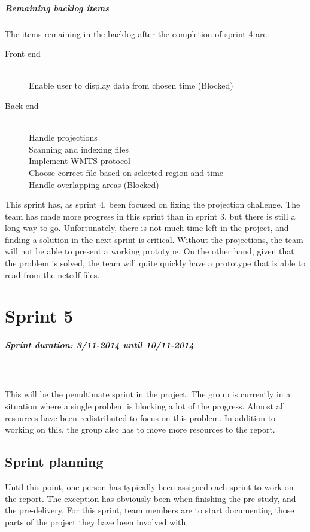 \documentclass[11pt,a4paper,titlepage,oneside]{report}
\begin{document}
\paragraph{Remaining backlog items}
The items remaining in the backlog after the completion of sprint 4 are:

\begin{description}
	\item[Front end] \hfill \\
	Enable user to display data from chosen time (Blocked)
	\item[Back end] \hfill \\
	Handle projections \hfill \\
	Scanning and indexing files \hfill \\
	Implement WMTS protocol \hfill \\
	Choose correct file based on selected region and time \hfill \\
	Handle overlapping areas (Blocked)
\end{description}
This sprint has, as sprint 4, been focused on fixing the projection challenge. The team has made more progress in this sprint than in sprint 3, but there is still a long way to go. Unfortunately, there is not much time left in the project, and finding a solution in the next sprint is critical. Without the projections, the team will not be able to present a working prototype. On the other hand, given that the problem is solved, the team will quite quickly have a prototype that is able to read from the \gls{netcdf} files. 

\chapter{Sprint 5}
\paragraph{Sprint duration: 3/11-2014 until 10/11-2014} \hfill \\
\\
\noindent
This will be the penultimate sprint in the project. The group is currently in a situation where a single problem is blocking a lot of the progress. Almost all resources have been redistributed to focus on this problem. In addition to working on this, the group also has to move more resources to the report. 

\section{Sprint planning}
Until this point, one person has typically been assigned each sprint to work on the report. The exception has obviously been when finishing the pre-study, and the pre-delivery. For this sprint, team members are to start documenting those parts of the project they have been involved with. 
\end{document}
